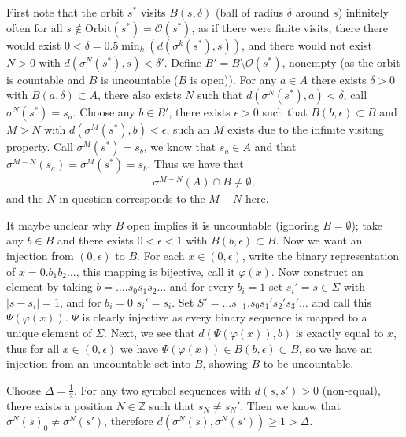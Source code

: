\begin{solution}[7.3]
First note that the orbit $s^{*}$ visits $B(s,\delta)$ (ball of radius $\delta$ around $s$) infinitely often for all $s\not \in  \textrm{Orbit}(s^{*}) = \mathcal{O}(s^{*}) $, as if there were finite visits, there there would exist $0<\delta = 0.5 \min_{k}(d(\sigma^{k}(s^{*}),s))$, and there would not exist $N>0$ with $d(\sigma^{N}(s^{*}),s) < \delta'$. Define $B' = B \setminus \mathcal{O}(s^{*})$, nonempty (as the orbit is countable and $B$ is uncountable ($B$ is open)). For any $a\in A$ there exists $\delta>0$ with $B(a,\delta) \subset A$, there also exists $N$ such that $d(\sigma^{N}(s^{*}), a) < \delta$, call $\sigma^{N}(s^{*})= s_{a}$. Choose any $b\in B'$, there exists $\epsilon >0$ such that $B(b,\epsilon) \subset B$ and $M>N$ with $d(\sigma^{M}(s^{*}), b)<\epsilon$, such an $M$ exists due to the infinite visiting property. Call $\sigma^{M}(s^{*}) = s_{b}$, we know that $s_a \in A$ and that $\sigma^{M-N}(s_a) = \sigma^M(s^{*}) = s_{b}$. Thus we have that
	\begin{align}
		\sigma^{M-N}(A) \cap B \neq \emptyset,
	\end{align}
and the $N$ in question corresponds to the $M-N$ here. 

It maybe unclear why $B$ open implies it is uncountable (ignoring $B=\emptyset$); take any $b\in B$ and there exists $0<\epsilon<1$ with $B(b, \epsilon) \subset B$. Now we want an injection from $(0, \epsilon)$ to $B$. For each $x \in (0, \epsilon)$, write the binary representation of $x= 0.b_1b_2 \ldots$, this mapping is bijective, call it $\varphi(x)$. Now construct an element by taking $b=\ldots\boldsymbol{.}s_0s_1s_2\ldots$ and for every $b_i=1$ set $s_i' = s \in \Sigma$ with $|s-s_i| =1$, and for $b_i=0$ $s_i' = s_i$. Set $S' = \ldots s_{-1}.s_0s_1's_2's_3'\ldots$ and call this $\Psi(\varphi(x)).$ $\Psi$ is clearly injective as every binary sequence is mapped to a unique element of $\Sigma$. Next, we see that $d(\Psi(\varphi(x)),b)$ is exactly equal to $x$, thus for all $x\in (0,\epsilon)$ we have $\Psi(\varphi(x)) \in B(b,\epsilon)\subset B$, so we have an injection from an uncountable set into $B$, showing $B$ to be uncountable.
\end{solution}

\begin{solution}[7.4]
	Choose $\Delta = \frac{1}{2}$. For any two symbol sequences with $d(s,s')>0$ (non-equal), there exists a position $N\in \mathbb{Z}$ such that $s_N \neq s_N'$. Then we know that $\sigma^{N}(s)_0 \neq \sigma^{N}(s')$, therefore $d(\sigma^{N}(s), \sigma^{N}(s'))\geq 1> \Delta$.
\end{solution}

